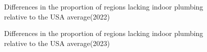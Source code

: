 \documentclass[
  letterpaper,
  DIV=11,
  numbers=noendperiod]{scrartcl}
\begin{document}
\begin{figure}


\caption{\label{fig-4}Differences in the proportion of regions lacking
indoor plumbing relative to the USA average(2022)}

\end{figure}%

\begin{figure}


\caption{\label{fig-5}Differences in the proportion of regions lacking
indoor plumbing relative to the USA average(2023)}

\end{figure}%
\end{document}
